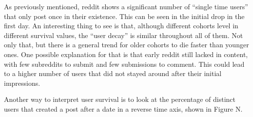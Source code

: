 As previously mentioned, reddit shows a significant number of ``single time users'' that only post once in their existence. This can be seen in the initial drop in the first day. An interesting thing to see is that, although different cohorts level in different survival values, the ``user decay'' is similar throughout all of them. Not only that, but there is a general trend for older cohorts to die faster than younger ones. One possible explanation for that is that early reddit still lacked in content, with few subreddits to submit and few submissions to comment. This could lead to a higher number of users that did not stayed around after their initial impressions. 

Another way to interpret user survival is to look at the percentage of distinct users that created a post after a date in a reverse time axis, shown in Figure N. 

